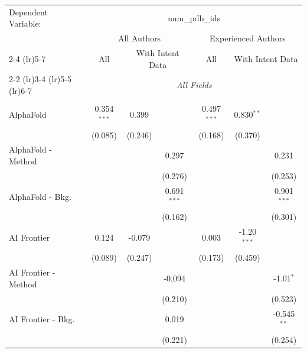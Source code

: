 \begingroup
\centering
\begin{tabular}{lcccccc}
   \tabularnewline \midrule \midrule
   Dependent Variable: & \multicolumn{6}{c}{num\_pdb\_ids}\\
 & \multicolumn{3}{c}{All Authors} & \multicolumn{3}{c}{Experienced Authors} \\
\cmidrule(lr){2-4} \cmidrule(lr){5-7}
 & \multicolumn{1}{c}{All} & \multicolumn{2}{c}{With Intent Data} & \multicolumn{1}{c}{All} & \multicolumn{2}{c}{With Intent Data} \\
\cmidrule(lr){2-2} \cmidrule(lr){3-4} \cmidrule(lr){5-5} \cmidrule(lr){6-7}
 & \multicolumn{6}{c}{\textit{All Fields}} \\ \\
   AlphaFold            & 0.354$^{***}$ & 0.399       &               & 0.497$^{***}$ & 0.830$^{**}$  &   \\   
                        & (0.085)       & (0.246)     &               & (0.168)       & (0.370)       &   \\   
   AlphaFold - Method   &               &             & 0.297         &               &               & 0.231\\   
                        &               &             & (0.276)       &               &               & (0.253)\\   
   AlphaFold - Bkg.     &               &             & 0.691$^{***}$ &               &               & 0.901$^{***}$\\   
                        &               &             & (0.162)       &               &               & (0.301)\\   
   AI Frontier          & 0.124         & -0.079      &               & 0.003         & -1.20$^{***}$ &   \\   
                        & (0.089)       & (0.247)     &               & (0.173)       & (0.459)       &   \\   
   AI Frontier - Method &               &             & -0.094        &               &               & -1.01$^{*}$\\   
                        &               &             & (0.210)       &               &               & (0.523)\\   
   AI Frontier - Bkg.   &               &             & 0.019         &               &               & -0.545$^{**}$\\   
                        &               &             & (0.221)       &               &               & (0.254)\\   

\end{tabular}

